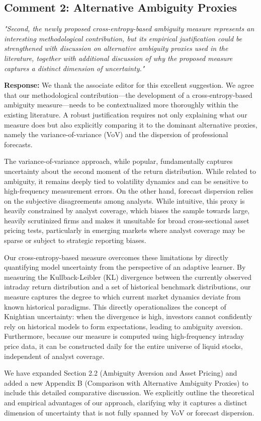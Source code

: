\documentclass[12pt]{article}
\begin{document}
\subsection*{Comment 2: Alternative Ambiguity Proxies}
\textit{"Second, the newly proposed cross-entropy-based ambiguity measure represents an interesting methodological contribution, but its empirical justification could be strengthened with discussion on alternative ambiguity proxies used in the literature, together with additional discussion of why the proposed measure captures a distinct dimension of uncertainty."}

\begin{highlightbox}
\textbf{Response:} We thank the associate editor for this excellent suggestion. We agree that our methodological contribution---the development of a cross-entropy-based ambiguity measure---needs to be contextualized more thoroughly within the existing literature. A robust justification requires not only explaining what our measure does but also explicitly comparing it to the dominant alternative proxies, namely the variance-of-variance (VoV) and the dispersion of professional forecasts. 

The variance-of-variance approach, while popular, fundamentally captures uncertainty about the second moment of the return distribution. While related to ambiguity, it remains deeply tied to volatility dynamics and can be sensitive to high-frequency measurement errors. On the other hand, forecast dispersion relies on the subjective disagreements among analysts. While intuitive, this proxy is heavily constrained by analyst coverage, which biases the sample towards large, heavily scrutinized firms and makes it unsuitable for broad cross-sectional asset pricing tests, particularly in emerging markets where analyst coverage may be sparse or subject to strategic reporting biases.

Our cross-entropy-based measure overcomes these limitations by directly quantifying model uncertainty from the perspective of an adaptive learner. By measuring the Kullback-Leibler (KL) divergence between the currently observed intraday return distribution and a set of historical benchmark distributions, our measure captures the degree to which current market dynamics deviate from known historical paradigms. This directly operationalizes the concept of Knightian uncertainty: when the divergence is high, investors cannot confidently rely on historical models to form expectations, leading to ambiguity aversion. Furthermore, because our measure is computed using high-frequency intraday price data, it can be constructed daily for the entire universe of liquid stocks, independent of analyst coverage. 

We have expanded Section 2.2 (Ambiguity Aversion and Asset Pricing) and added a new Appendix B (Comparison with Alternative Ambiguity Proxies) to include this detailed comparative discussion. We explicitly outline the theoretical and empirical advantages of our approach, clarifying why it captures a distinct dimension of uncertainty that is not fully spanned by VoV or forecast dispersion.
\end{highlightbox}
\end{document}

